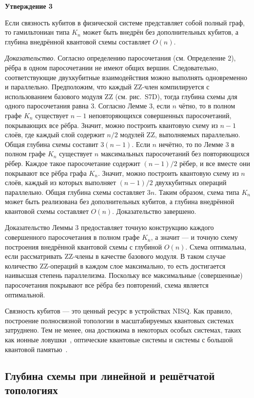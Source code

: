 \textbf{Утверждение 3}

Если связность кубитов в физической системе представляет собой полный граф, то
гамильтониан типа $K_n$ может быть внедрён без дополнительных кубитов, а
глубина внедрённой квантовой схемы составляет $O(n)$.

\textit{Доказательство.} Согласно определению паросочетания (см. Определение
2), рёбра в одном паросочетании не имеют общих вершин. Следовательно,
соответствующие двухкубитные взаимодействия можно выполнять одновременно и
параллельно. Предположим, что каждый ZZ-член компилируется с использованием
базового модуля ZZ (см. рис.~S7D), тогда глубина схемы для одного паросочетания
равна 3. Согласно Лемме 3, если $n$ чётно, то в полном графе $K_n$ существует
$n - 1$ неповторяющихся совершенных паросочетаний, покрывающих все рёбра.
Значит, можно построить квантовую схему из $n - 1$ слоёв, где каждый слой
содержит $n/2$ модулей ZZ, выполняемых параллельно. Общая глубина схемы
составит $3(n - 1)$. Если $n$ нечётно, то по Лемме 3 в полном графе $K_n$
существует $n$ максимальных паросочетаний без повторяющихся рёбер. Каждое такое
паросочетание содержит $(n - 1)/2$ рёбер, и все вместе они покрывают все рёбра
графа $K_n$. Значит, можно построить квантовую схему из $n$ слоёв, каждый из
которых выполняет $(n - 1)/2$ двухкубитных операций параллельно. Общая глубина
схемы составляет $3n$. Таким образом, схема типа $K_n$ может быть реализована
без дополнительных кубитов, а глубина внедрённой квантовой схемы составляет
$O(n)$. Доказательство завершено.

Доказательство Леммы 3 предоставляет точную конструкцию каждого совершенного
паросочетания в полном графе $K_n$, а значит — и точную схему построения
внедрённой квантовой схемы с глубиной $O(n)$. Схема оптимальна, если
рассматривать ZZ-члены в качестве базового модуля. В таком случае количество
ZZ-операций в каждом слое максимально, то есть достигается наивысшая степень
параллелизма. Поскольку все максимальные (совершенные) паросочетания покрывают
все рёбра без повторений, схема является оптимальной.

Связность кубитов — это ценный ресурс в устройствах NISQ. Как правило,
построение полносвязной топологии в масштабируемых квантовых системах
затруднено. Тем не менее, она достижима в некоторых особых системах, таких как
ионные ловушки~\cite{cite_52}, оптические квантовые системы и системы с большой
квантовой памятью~\cite{cite_15}.

\subsection*{Глубина схемы при линейной и решётчатой топологиях}

